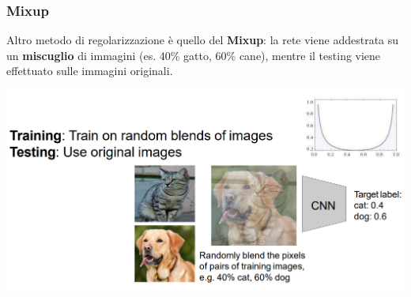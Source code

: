\documentclass[12pt]{article}
\begin{document}
\subsubsection{Mixup}
Altro metodo di regolarizzazione è quello del \textbf{Mixup}: la rete viene addestrata su un \textbf{miscuglio} di immagini (es. 40\% gatto, 60\% cane), mentre il testing viene effettuato sulle immagini originali.
\begin{center}
    \includegraphics[width =1\linewidth]{Images/180.PNG}
\end{center}
\end{document}
